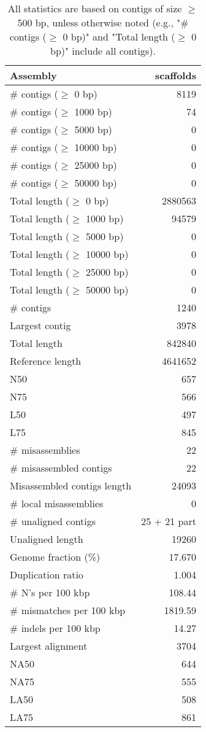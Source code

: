 \documentclass[12pt,a4paper]{article}
\begin{document}
\begin{table}[ht]
\begin{center}
\caption{All statistics are based on contigs of size $\geq$ 500 bp, unless otherwise noted (e.g., "\# contigs ($\geq$ 0 bp)" and "Total length ($\geq$ 0 bp)" include all contigs).}
\begin{tabular}{|l*{1}{|r}|}
\hline
Assembly & scaffolds \\ \hline
\# contigs ($\geq$ 0 bp) & 8119 \\ \hline
\# contigs ($\geq$ 1000 bp) & 74 \\ \hline
\# contigs ($\geq$ 5000 bp) & 0 \\ \hline
\# contigs ($\geq$ 10000 bp) & 0 \\ \hline
\# contigs ($\geq$ 25000 bp) & 0 \\ \hline
\# contigs ($\geq$ 50000 bp) & 0 \\ \hline
Total length ($\geq$ 0 bp) & 2880563 \\ \hline
Total length ($\geq$ 1000 bp) & 94579 \\ \hline
Total length ($\geq$ 5000 bp) & 0 \\ \hline
Total length ($\geq$ 10000 bp) & 0 \\ \hline
Total length ($\geq$ 25000 bp) & 0 \\ \hline
Total length ($\geq$ 50000 bp) & 0 \\ \hline
\# contigs & 1240 \\ \hline
Largest contig & 3978 \\ \hline
Total length & 842840 \\ \hline
Reference length & 4641652 \\ \hline
N50 & 657 \\ \hline
N75 & 566 \\ \hline
L50 & 497 \\ \hline
L75 & 845 \\ \hline
\# misassemblies & 22 \\ \hline
\# misassembled contigs & 22 \\ \hline
Misassembled contigs length & 24093 \\ \hline
\# local misassemblies & 0 \\ \hline
\# unaligned contigs & 25 + 21 part \\ \hline
Unaligned length & 19260 \\ \hline
Genome fraction (\%) & 17.670 \\ \hline
Duplication ratio & 1.004 \\ \hline
\# N's per 100 kbp & 108.44 \\ \hline
\# mismatches per 100 kbp & 1819.59 \\ \hline
\# indels per 100 kbp & 14.27 \\ \hline
Largest alignment & 3704 \\ \hline
NA50 & 644 \\ \hline
NA75 & 555 \\ \hline
LA50 & 508 \\ \hline
LA75 & 861 \\ \hline
\end{tabular}
\end{center}
\end{table}
\end{document}
